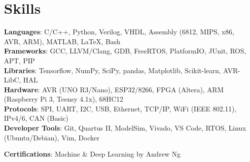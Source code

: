 

\section{Skills}
 \begin{itemize}[leftmargin=0.15in, label={}]
    \small{\item{
     \textbf{Languages}{: C/C++, Python, Verilog, VHDL, Assembly (6812, MIPS, x86, AVR, ARM), MATLAB, \LaTeX, Bash} \\
     \textbf{Frameworks}{: GCC, LLVM/Clang, GDB, FreeRTOS, PlatformIO, JUnit, ROS, APT, PIP} \\
     \textbf{Libraries}{: Tensorflow, NumPy, SciPy, pandas, Matplotlib, Scikit-learn, AVR-LibC, HAL} \\
     \textbf{Hardware}{: AVR (UNO R3/Nano), ESP32/8266, FPGA (Altera), ARM (Raspberry Pi 3, Teensy 4.1x), 68HC12} \\
     \textbf{Protocols}{: SPI, UART, I2C, USB, Ethernet, TCP/IP, WiFi (IEEE 802.11), IPv4/6, CAN (Basic)} \\
     \textbf{Developer Tools}{: Git, Quartus II, ModelSim, Vivado, VS Code, RTOS, Linux (Ubuntu/Debian), Vim, Docker} \\
    }}
    \textbf{Certifications}{: Machine \& Deep Learning by Andrew Ng}
    \spaceReducerMini
 \end{itemize}

 